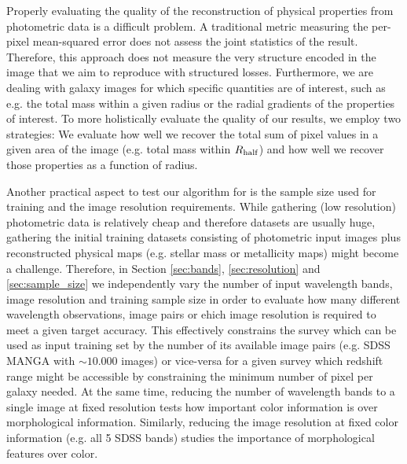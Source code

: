 \documentclass[conference]{IEEEtran}
\begin{document}
Properly evaluating the quality of the reconstruction of physical properties from photometric data is a difficult problem. A traditional metric measuring the per-pixel mean-squared error does not assess the joint statistics of the result. Therefore, this approach does not measure the very structure encoded in the image that we aim to reproduce with structured losses. Furthermore, we are dealing with galaxy images for which specific quantities are of interest, such as e.g. the total mass within a given radius or the radial gradients of the properties of interest.
To more holistically evaluate the quality of our results, we employ two strategies: We evaluate how well we recover the total sum of pixel values in a given area of the image (e.g. total mass within $R_{\rm half}$) and how well we recover those properties as a function of radius. 

Another practical aspect to test our algorithm for is the sample size used for training and the image resolution requirements. While gathering (low resolution) photometric data is relatively cheap and therefore datasets are usually huge, gathering the initial training datasets consisting of photometric input images plus reconstructed physical maps (e.g. stellar mass or metallicity maps) might become a challenge. Therefore, in Section \ref{sec:bands},  \ref{sec:resolution} and \ref{sec:sample_size} we independently vary the number of input wavelength bands, image resolution and training sample size in order to evaluate how many different wavelength observations, image pairs or ehich image resolution is required to meet a given target accuracy. This effectively constrains the survey which can be used as input training set by the number of its available image pairs (e.g. SDSS MANGA with $\sim10.000$ images) or vice-versa for a given survey which redshift range might be accessible by constraining the minimum number of pixel per galaxy needed. At the same time, reducing the number of wavelength bands to a single image at fixed resolution tests how important color information is over morphological information. Similarly, reducing the image resolution at fixed color information (e.g. all 5 SDSS bands) studies the importance of morphological features over color.  
\end{document}
